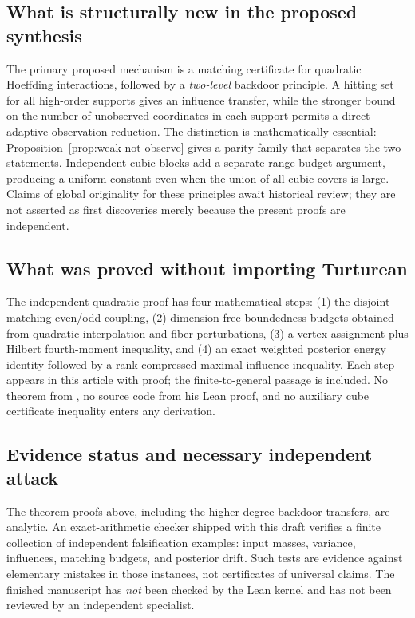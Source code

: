 \documentclass[11pt,letterpaper]{article}
\theoremstyle{definition}
\begin{document}
\subsection{What is structurally new in the proposed synthesis}
The primary proposed mechanism is a matching certificate for quadratic
Hoeffding interactions, followed by a \emph{two-level} backdoor
principle. A hitting set for all high-order supports gives an
influence transfer, while the stronger bound on the number of
unobserved coordinates in each support permits a direct adaptive
observation reduction. The distinction is mathematically essential:
Proposition~\ref{prop:weak-not-observe} gives a parity family that
separates the two statements. Independent cubic blocks add a separate
range-budget argument, producing a uniform constant even when the
union of all cubic covers is large. Claims of global originality for
these principles await historical review; they are not asserted as
first discoveries merely because the present proofs are independent.

\subsection{What was proved without importing Turturean}
The independent quadratic proof has four mathematical steps: (1) the disjoint-matching even/odd
coupling, (2) dimension-free boundedness budgets obtained from
quadratic interpolation and fiber perturbations, (3) a vertex
assignment plus Hilbert fourth-moment inequality, and (4) an exact
weighted posterior energy identity followed by a rank-compressed
maximal influence inequality. Each step appears in this article
with proof; the finite-to-general passage is included. No theorem
from \cite{Turturean2026}, no source code from his Lean proof, and
no auxiliary cube certificate inequality enters any derivation.

\subsection{Evidence status and necessary independent attack}
The theorem proofs above, including the higher-degree backdoor transfers, are analytic. An exact-arithmetic checker
shipped with this draft verifies a finite collection of independent
falsification examples: input masses, variance, influences,
matching budgets, and posterior drift. Such tests are evidence
against elementary mistakes in those instances, not certificates
of universal claims. The finished manuscript has \emph{not}
been checked by the Lean kernel and has not been reviewed by an
independent specialist.
\end{document}
